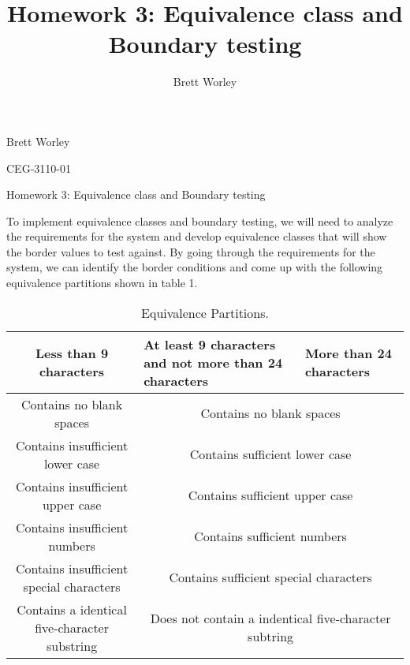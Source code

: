 \documentclass[12pt,letterpaper]{article}
\author{Brett Worley}
\title{Homework 3: Equivalence class and Boundary testing}
\begin{document}
Brett Worley

CEG-3110-01

\centerline{Homework 3: Equivalence class and Boundary testing}

To implement equivalence classes and boundary testing, we will need to analyze the requirements
for the system and develop equivalence classes that will show the border values to test against. By going through the requirements for the system, we can identify the border conditions and come up with the following equivalence partitions shown in table 1.

\begin{table}[h!]
  \begin{center}
    \caption{Equivalence Partitions.}
    \label{tab:table1}
    
    \begin{tabular}{||c|m{4cm}|m{5cm}||}
    \hline
    Less than 9 characters & At least 9 characters and not more than 24
    characters & More than 24 characters \\
    
    \hline \hline
    \multicolumn{1}{||c|}{Contains no blank spaces} & \multicolumn{2}{c||}{Contains no blank spaces} \\
    
    \hline \hline
    \multicolumn{1}{||c|}{Contains insufficient lower case} 
    & \multicolumn{2}{c||}{Contains sufficient lower case} \\
    
    \hline \hline
    \multicolumn{1}{||c|}{Contains insufficient upper case} 
    & \multicolumn{2}{c||}{Contains sufficient upper case} \\
    
    \hline \hline
    \multicolumn{1}{||c|}{Contains insufficient numbers} 
    & \multicolumn{2}{c||}{Contains sufficient numbers} \\
    
    \hline \hline
    \multicolumn{1}{||c|}{Contains insufficient special characters} 
    & \multicolumn{2}{c||}{Contains sufficient special characters} \\
    
    \hline \hline
    \multicolumn{1}{||c|}{Contains a identical five-character substring}
    & \multicolumn{2}{c||}{Does not contain a indentical five-character subtring} \\
    \hline
    \end{tabular}
  \end{center}
\end{table}
\end{document}
